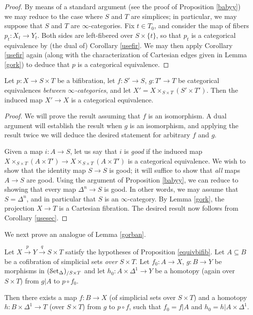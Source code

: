 \begin{proof}
By means of a standard argument (see the proof of Proposition \ref{babyy}) we may reduce to the case where $S$ and $T$ are simplices; in particular, we may suppose that $S$ and $T$ are $\infty$-categories.
Fix $t \in T_0$, and consider the map of fibers $p_{t}: X_{t} \rightarrow Y_{t}$. Both sides are left-fibered over $S \times \{t\}$, so that $p_{t}$ is a categorical equivalence by (the dual of) Corollary \ref{usefir}. We may then apply Corollary \ref{usefir} again (along with the characterization of Cartesian edges given in Lemma \ref{gork}) to deduce that $p$ is a categorical equivalence.
\end{proof}

\begin{proposition}\label{equivbifib2}
Let $p: X \rightarrow S \times T$ be a bifibration, let $f: S' \rightarrow S$,
$g: T' \rightarrow T$ be categorical equivalences {\em between $\infty$-categories}, and let $X' = X \times_{S \times T} (S' \times T')$.
Then the induced map $X' \rightarrow X$ is a categorical equivalence.
\end{proposition}

\begin{proof}
We will prove the result assuming that $f$ is an isomorphism. A dual argument will establish the result when $g$ is an isomorphism, and applying the result twice we will deduce the desired statement for arbitrary $f$ and $g$.

Given a map $i: A \rightarrow S$, let us say that $i$ is {\it good} if the induced map
$X \times_{S \times T} (A \times T') \rightarrow X \times_{S \times T} (A \times T')$
is a categorical equivalence. We wish to show that the identity map $S \rightarrow S$ is good; it will suffice to show that {\em all} maps $A \rightarrow S$ are good. Using the argument of Proposition \ref{babyy}, we can reduce to showing that every map $\Delta^n \rightarrow S$ is good. In other words, we may assume that $S = \Delta^n$, and in particular that $S$ is an $\infty$-category.
By Lemma \ref{gork}, the projection $X \rightarrow T$ is a Cartesian fibration. The desired result now follows from Corollary \ref{usesec}.
\end{proof}

We next prove an analogue of Lemma \ref{gorban}.

\begin{lemma}\label{gorbaniz}
Let $X \stackrel{p}{\rightarrow} Y \stackrel{q}{\rightarrow} S \times T$ satisfy the hypotheses of Proposition \ref{equivbifib}. Let $A \subseteq B$ be a cofibration of simplicial sets {\em over} $S \times T$. 
Let $f_0: A \rightarrow X$, $g: B \rightarrow Y$ be morphisms in $(\operatorname{\mathcal{S}et_{\Delta}})_{/ S \times T}$ 
and let $h_0: A \times \Delta^1 \rightarrow Y$ be a homotopy (again over $S \times T$) from $g|A$  to $p \circ f_0$.

Then there exists a map $f: B \rightarrow X$ (of simplicial sets over $S \times T$) and a homotopy $h: B \times \Delta^1 \rightarrow T$ (over $S \times T$) from $g$ to $p \circ f$, such that
$f_0 = f|A$ and $h_0 = h| A \times \Delta^1$.
\end{lemma}


